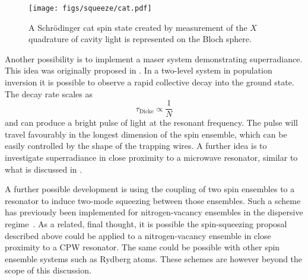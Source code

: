 \begin{figure}
  \centering
  \texttt{[image: figs/squeeze/cat.pdf]}
  \caption[Representation of a Schr\"odinger cat spin state]{
    A Schr\"odinger cat spin state created by measurement of the $X$
  quadrature of cavity light is represented on the Bloch sphere.}
  \label{squeeze:fig:cat}
\end{figure}

Another possibility is to implement a maser system demonstrating superradiance.
This idea was originally proposed in . %
In a two-level system in population inversion it is possible to observe
a rapid collective decay into the ground state. The decay rate scales as
%
\begin{equation}
  \tau_\text{Dicke} \propto \frac{1}{N}
\end{equation}
% 
and can produce a bright pulse of light at the resonant frequency. The pulse
will travel favourably in the longest dimension of the spin ensemble, which can
be easily controlled by the shape of the trapping wires. A further idea is to
investigate superradiance in close proximity to a microwave resonator, similar
to what is discussed in .

A further possible development is using the coupling of two spin ensembles to a
resonator to induce two-mode squeezing between those ensembles. Such a scheme
has previously been implemented for nitrogen-vacancy ensembles in the
dispersive regime~\cite{PhysRevA.99.012325}. As a related, final thought, it
is possible the spin-squeezing proposal described above could be applied to a
nitrogen-vacancy ensemble in close proximity to a CPW resonator. The same could
be possible with other spin ensemble systems such as Rydberg atoms. These
schemes are however beyond the scope of this discussion.
